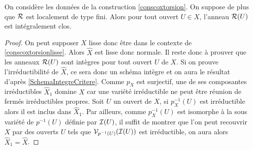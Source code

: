 \begin{thm}
On considère les données de la construction \ref{conscoxtorsion}. On suppose de plus que $\mathcal{R}$ est localement de type fini. Alors pour tout ouvert $U\in X$, l'anneau $\mathcal{R}(U)$ est intégralement clos.
\end{thm}
\begin{proof}
On peut supposer $X$ lisse donc être dans le contexte de \ref{conscoxtorsionlisse}. Alors $\widehat{X}$ est lisse donc normale. Il reste donc à prouver que les anneaux $\mathcal{R}(U)$ sont intègres pour tout ouvert $U$ de $X$. Si on prouve l'irréductibilité de $\widehat{X}$, ce sera donc un schéma intègre et on aura le résultat d'après \ref{SchemaIntegreCritere}. Comme $p_X$ est surjectif, une de ses composantes irréductibles $\widehat{X}_1$ domine $X$ car une variété irréductible ne peut être réunion de fermés irréductibles propres. Soit $U$ un ouvert de $X$, si $p_X^{-1}(U)$ est irréductible alors il est inclus dans $\widehat{X}_1$. Par ailleurs, comme $p_X^{-1}(U)$ est isomorphe à la sous variété de $p^{-1}(U)$ définie par $\mathcal{I}(U)$, il suffit de montrer que l'on peut recouvrir $X$ par des ouverts $U$ tels que $\mathcal{V}_{p^{-1}(U)}(\mathcal{I}(U))$ est irréductible, on aura alors $\widehat{X}_1=\widehat{X}$.


\end{proof}
